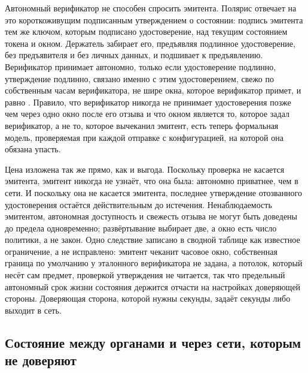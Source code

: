 Автономный верификатор не способен спросить эмитента. Полярис отвечает на это
короткоживущим подписанным утверждением о состоянии: подпись эмитента тем же ключом, которым
подписано удостоверение, над текущим состоянием токена и окном. Держатель забирает его,
предъявляя подлинное удостоверение, без предъявителя и без личных данных, и подшивает к
предъявлению. Верификатор принимает автономно, только если удостоверение подлинно, утверждение
подлинно, связано именно с этим удостоверением, свежо по собственным часам верификатора, не шире
окна, которое верификатор примет, и равно . Правило, что верификатор никогда не
принимает удостоверения позже чем через одно окно после его отзыва и что окном является то,
которое задал верификатор, а не то, которое вычеканил эмитент, есть теперь формальная модель,
проверяемая при каждой отправке с конфигурацией, на которой она обязана упасть. \sImpl

Цена изложена так же прямо, как и выгода. Поскольку проверка не касается эмитента, эмитент никогда
не узнаёт, что она была: автономно приватнее, чем в сети. И поскольку она не касается эмитента,
последнее утверждение отозванного удостоверения остаётся действительным до истечения.
Ненаблюдаемость эмитентом, автономная доступность и свежесть отзыва не могут быть доведены до
предела одновременно; развёртывание выбирает две, а окно есть число политики, а не закон. Одно
следствие записано в сводной таблице как известное ограничение, а не исправлено: эмитент чеканит
часовое окно, собственная граница по умолчанию у эталонного верификатора не задана, а потолок,
который несёт сам предмет, проверкой утверждения не читается, так что предельный автономный срок
жизни состояния держится отчасти на настройках доверяющей стороны. Доверяющая сторона, которой
нужны секунды, задаёт секунды либо выходит в сеть.

\subsection{Состояние между органами и через сети, которым не доверяют}

